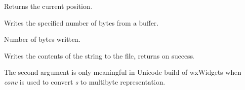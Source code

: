 

\label{wxffiletell}


Returns the current position.


\label{wxffilewrite}


Writes the specified number of bytes from a buffer.





Number of bytes written.


\label{wxffilewrites}


Writes the contents of the string to the file, returns \true on success.

The second argument is only meaningful in Unicode build of wxWidgets when
{\it conv} is used to convert {\it s} to multibyte representation.


